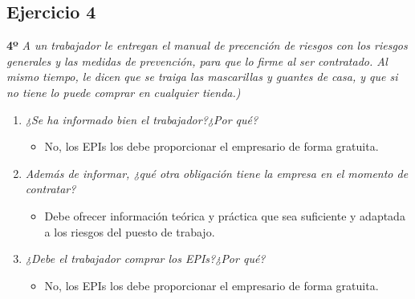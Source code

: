 \documentclass{article}
\begin{document}
      \subsection{Ejercicio 4}
        \textbf{4º} \textit{A un trabajador le entregan el manual de precención de riesgos con los riesgos generales y las medidas de prevención, para que lo firme al ser contratado. Al mismo tiempo, le dicen que se 
        traiga las mascarillas y guantes de casa, y que si no tiene lo puede comprar en cualquier tienda.)}
        \\
        \begin{enumerate}[label=(\alph*)]
          \item \textit{¿Se ha informado bien el trabajador?¿Por qué?}
            \begin{itemize}
              \item No, los EPIs los debe proporcionar el empresario de forma gratuita.
            \end{itemize}
          \item \textit{Además de informar, ¿qué otra obligación tiene la empresa en el momento de contratar?}
            \begin{itemize}
              \item Debe ofrecer información teórica y práctica que sea suficiente y adaptada a los riesgos del puesto de trabajo.
            \end{itemize}
          \item \textit{¿Debe el trabajador comprar los EPIs?¿Por qué?}
            \begin{itemize}
              \item No, los EPIs los debe proporcionar el empresario de forma gratuita.
            \end{itemize}
        \end{enumerate}
    \newpage
\end{document}
